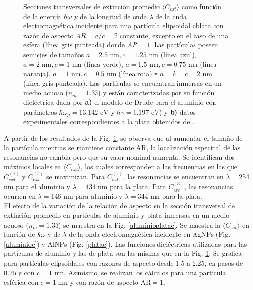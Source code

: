 \begin{figure}[h!]
	\quad%
	\caption{Secciones transversales de extinción promedio $\langle C_{ext}\rangle$ como función de la energía $\hbar\omega$ y de la longitud de onda $\lambda$ de la onda electromagnética incidente para una partícula elipsoidal oblata con razón de aspecto $AR=a/c=2$ constante, excepto en el caso de una esfera (línea gris punteada) donde $AR=1$. Las partículas poseen semiejes de tamaños $a=2.5 \text{ nm}, c=1.25 \text{ nm}$ (línea azul), $a=2 \text{ nm}, c=1 \text{ nm}$ (línea verde), $a=1.5 \text{ nm}, c=0.75 \text{ nm}$ (línea naranja), $a=1 \text{ nm}, c=0.5 \text{ nm}$ (línea roja) y $a=b=c=2\text{ nm}$ (línea gris punteada). Las partículas se encuentran inmersas en un medio acuoso ($n_m=1.33$) y están caracterizadas por su función dieléctrica dada por  \textbf{a)} el modelo de Drude para el aluminio con parámetros $\hbar\omega_p=13.142\text{ eV}$ y $\hbar\gamma=0.197\text{ eV}$) y \textbf{b)} datos experimentales correspondientes a la plata obtenidos de \cite{Plata}. }\label{aluminioplataAR}
\end{figure}
A partir de los resultados de la Fig. \ref{aluminioplataAR}, se observa que al aumentar el tamaño de la partícula mientras se mantiene constante AR, la localización espectral de las resonancias no cambia pero que su valor nominal aumenta. Se identifican dos máximos locales en $\langle C_{ext}\rangle$,  los cuales corresponden a las frecuencias en las que $C_{ext}^{(1)}$ y $C_{ext}^{(3)}$ se maximizan. Para $C_{ext}^{(1)}$, las resonancias  se encuentran en $\lambda=$254 nm para el aluminio y $\lambda=$434 nm para la plata. Para $C_{ext}^{(3)}$, las resonancias ocurren en $\lambda=$146 nm para aluminio y $\lambda=$344 nm para la plata. \\

El efecto de la variación de la relación de aspecto en la sección transversal de extinción promedio en partículas de aluminio y plata inmersas en un medio acuoso ($n_m=1.33$) se muestra en la Fig. \ref{aluminioplatac}. Se muestra la $\langle C_{ext}\rangle$ en función de $\hbar\omega$ y de $\lambda$  de la onda electromagnética incidente en AgNPs (Fig. \ref{aluminioc}) y AlNPs (Fig. \ref{platac}). Las funciones dieléctricas utilizadas para las partículas de aluminio y las de plata son las mismas que en la Fig. \ref{aluminioplataAR}. Se grafica para partículas elipsoidales con razones de aspecto desde 1.5 a 2.25, en pasos de 0.25 y con $c=1\text{ nm}$. Asimismo, se realizan los cálculos para una partícula esférica con  $c=1\text{ nm}$ y con razón de aspecto AR$=1$. 


